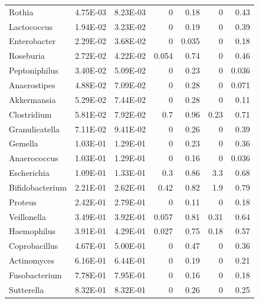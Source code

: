 {\begin{longtable}{ | l | r | r | r | r | r | r  | }
		Rothia & 4.75E-03 & 8.23E-03 & 0 & 0.18 & 0 & 0.43 \\ 
		Lactococcus & 1.94E-02 & 3.23E-02 & 0 & 0.19 & 0 & 0.39 \\ 
		Enterobacter & 2.29E-02 & 3.68E-02 & 0 & 0.035 & 0 & 0.18 \\ 
		Roseburia & 2.72E-02 & 4.22E-02 & 0.054 & 0.74 & 0 & 0.46 \\ 
		Peptoniphilus & 3.40E-02 & 5.09E-02 & 0 & 0.23 & 0 & 0.036 \\ 
		Anaerostipes & 4.88E-02 & 7.09E-02 & 0 & 0.28 & 0 & 0.071 \\ 
		Akkermansia & 5.29E-02 & 7.44E-02 & 0 & 0.28 & 0 & 0.11 \\ 
		Clostridium & 5.81E-02 & 7.92E-02 & 0.7 & 0.96 & 0.23 & 0.71 \\ 
		Granulicatella & 7.11E-02 & 9.41E-02 & 0 & 0.26 & 0 & 0.39 \\ 
		Gemella & 1.03E-01 & 1.29E-01 & 0 & 0.23 & 0 & 0.36 \\ 
		Anaerococcus & 1.03E-01 & 1.29E-01 & 0 & 0.16 & 0 & 0.036 \\ 
		Escherichia & 1.09E-01 & 1.33E-01 & 0.3 & 0.86 & 3.3 & 0.68 \\ 
		Bifidobacterium & 2.21E-01 & 2.62E-01 & 0.42 & 0.82 & 1.9 & 0.79 \\ 
		Proteus & 2.42E-01 & 2.79E-01 & 0 & 0.11 & 0 & 0.18 \\ 
		Veillonella & 3.49E-01 & 3.92E-01 & 0.057 & 0.81 & 0.31 & 0.64 \\ 
		Haemophilus & 3.91E-01 & 4.29E-01 & 0.027 & 0.75 & 0.18 & 0.57 \\ 
		Coprobacillus & 4.67E-01 & 5.00E-01 & 0 & 0.47 & 0 & 0.36 \\ 
		Actinomyces & 6.16E-01 & 6.44E-01 & 0 & 0.19 & 0 & 0.21 \\ 
		Fusobacterium & 7.78E-01 & 7.95E-01 & 0 & 0.16 & 0 & 0.18 \\ 
		Sutterella & 8.32E-01 & 8.32E-01 & 0 & 0.26 & 0 & 0.25
		
	\end{longtable}
}






